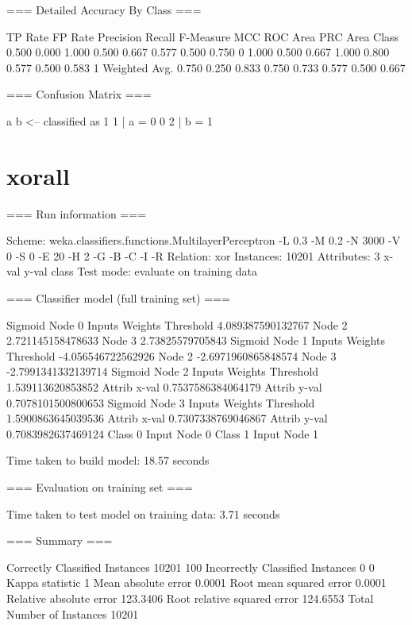 \documentclass{report}
\begin{document}
	=== Detailed Accuracy By Class ===
	
	TP Rate  FP Rate  Precision  Recall   F-Measure  MCC      ROC Area  PRC Area  Class
	0.500    0.000    1.000      0.500    0.667      0.577    0.500     0.750     0
	1.000    0.500    0.667      1.000    0.800      0.577    0.500     0.583     1
	Weighted Avg.    0.750    0.250    0.833      0.750    0.733      0.577    0.500     0.667     
	
	=== Confusion Matrix ===
	
	a b   <-- classified as
	1 1 | a = 0
	0 2 | b = 1
	
	\section{xorall}
	=== Run information ===
	
	Scheme:       weka.classifiers.functions.MultilayerPerceptron -L 0.3 -M 0.2 -N 3000 -V 0 -S 0 -E 20 -H 2 -G -B -C -I -R
	Relation:     xor
	Instances:    10201
	Attributes:   3
	x-val
	y-val
	class
	Test mode:    evaluate on training data
	
	=== Classifier model (full training set) ===
	
	Sigmoid Node 0
	Inputs    Weights
	Threshold    4.089387590132767
	Node 2    2.721145158478633
	Node 3    2.73825579705843
	Sigmoid Node 1
	Inputs    Weights
	Threshold    -4.056546722562926
	Node 2    -2.6971960865848574
	Node 3    -2.7991341332139714
	Sigmoid Node 2
	Inputs    Weights
	Threshold    1.539113620853852
	Attrib x-val    0.7537586384064179
	Attrib y-val    0.7078101500800653
	Sigmoid Node 3
	Inputs    Weights
	Threshold    1.5900863645039536
	Attrib x-val    0.7307338769046867
	Attrib y-val    0.7083982637469124
	Class 0
	Input
	Node 0
	Class 1
	Input
	Node 1
	
	
	Time taken to build model: 18.57 seconds
	
	=== Evaluation on training set ===
	
	Time taken to test model on training data: 3.71 seconds
	
	=== Summary ===
	
	Correctly Classified Instances       10201              100      %
	Incorrectly Classified Instances         0                0      %
	Kappa statistic                          1     
	Mean absolute error                      0.0001
	Root mean squared error                  0.0001
	Relative absolute error                123.3406 %
	Root relative squared error            124.6553 %
	Total Number of Instances            10201     
	
\end{document}
